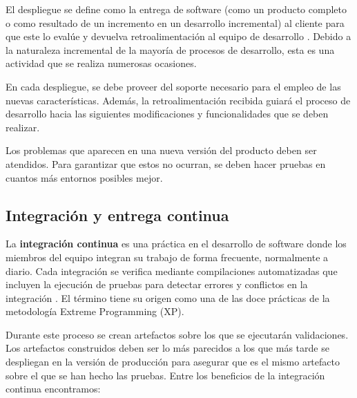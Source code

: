 \documentclass[11pt,spanish,listoffigures]{tfgetsinf}
\begin{document}
El despliegue se define como la entrega de software (como un producto completo o como resultado de un incremento en un desarrollo incremental) al cliente para que este lo evalúe y devuelva retroalimentación al equipo de desarrollo \cite{Pressman}. Debido a la naturaleza incremental de la mayoría de procesos de desarrollo, esta es una actividad que se realiza numerosas ocasiones. 

En cada despliegue, se debe proveer del soporte necesario para el empleo de las nuevas características. Además, la retroalimentación recibida guiará el proceso de desarrollo hacia las siguientes modificaciones y funcionalidades que se deben realizar.

Los problemas que aparecen en una nueva versión del producto deben ser atendidos. Para garantizar que estos no ocurran, se deben hacer pruebas en cuantos más entornos posibles mejor.

\subsection{Integración y entrega continua}

La \textbf{integración continua} es una práctica en el desarrollo de software donde los miembros del equipo integran su trabajo de forma frecuente, normalmente a diario. Cada integración se verifica mediante compilaciones automatizadas que incluyen la ejecución de pruebas para detectar errores y conflictos en la integración \cite{Fowler2006}. El término tiene su origen como una de las doce prácticas de la metodología Extreme Programming (XP).

Durante este proceso se crean artefactos sobre los que se ejecutarán validaciones. Los artefactos construidos deben ser lo más parecidos a los que más tarde se despliegan en la versión de producción para asegurar que es el mismo artefacto sobre el que se han hecho las pruebas. Entre los beneficios de la integración continua encontramos:
 
\end{document}
